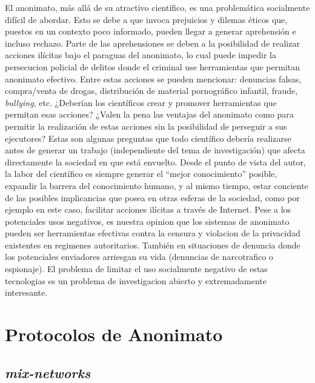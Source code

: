 El anonimato, más allá de su atractivo científico, es una problemática socialmente difícil de abordar. Esto se debe a que 
invoca prejuicios y dilemas éticos que, puestos en un contexto poco informado, pueden llegar a generar 
aprehensión e incluso rechazo. Parte de las aprehensiones se deben a la posibilidad de realizar acciones ilícitas 
bajo el paraguas del anonimato, lo cual puede impedir la persecucion policial de delitos donde el criminal use herramientas que permitan anonimato efectivo. Entre estas acciones se pueden mencionar: 
denuncias falsas, compra/venta de drogas, distribución de material pornográfico infantil, fraude, \emph{bullying}, etc. 
¿Deberían los científicos crear y promover herramientas que permitan esas acciones? 
¿Valen la pena las ventajas del anonimato como para permitir la realización de estas acciones sin la posibilidad de 
perseguir a sus ejecutores?
Estas son algunas preguntas que todo científico 
debería realizarse antes de generar un trabajo (independiente del tema de investigación) que afecta directamente la sociedad en que está envuelto. 
Desde el punto de vista 
del autor, la labor del científico es siempre generar el ``mejor conocimiento'' posible, expandir la barrera del conocimiento 
humano, y al mismo tiempo, estar conciente de las posibles implicancias que posea en otras esferas de la sociedad, como por ejemplo en este caso, 
facilitar acciones ilícitas a través de Internet. Pese a los potenciales usos negativos, es nuestra opinion que los sistemas de anonimato pueden ser herramientas efectivas contra la censura y violacion de la privacidad existentes en regimenes autoritarios. También en situaciones de denuncia donde los potenciales enviadores arriesgan su vida (denuncias de narcotrafico o espionaje). El problema de limitar el uso socialmente negativo de estas tecnologias es un problema de investigacion abierto y extremadamente interesante.  

\section{Protocolos de Anonimato}

\subsection{\emph{mix-networks}}

